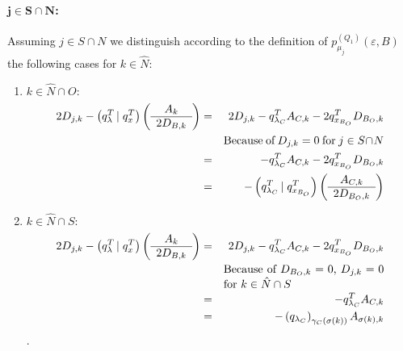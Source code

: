 \documentclass[a4paper]{article}
\newcommand{\pmu}[2]{\ensuremath{p_{\mu_{j}}^{(#1)}(\varepsilon, #2)}}
\begin{document}
\paragraph{$\mathbf{j \in S \cap N}$:}
Assuming $j \in S \cap N$ we distinguish according to the definition of
\pmu{Q_{1}}{B} the following cases for $k \in \hat{N}$:
\begin{enumerate}
\item $k \in \hat{N} \cap O:$
\begin{eqnarray}
\label{eq:r1_j_S_N_k_N_O}
    2D_{j,k}
    -\left(q_{\lambda}^{T} \left| \right. q_{x}^{T} \right)
    \left(\begin{array}{c}
            A_{k} \\
	    \hline
	    2D_{B, k}
	  \end{array}
    \right)
&=&
2D_{j,k} - q_{\lambda_{C}}^{T}A_{C, k} - 2q_{x_{B_{O}}}^{T}D_{B_{O},k}
\nonumber \\
&&\begin{minipage}{5cm}
Because of $D_{j,k}=0$ for $j \in S \cap N$
\end{minipage}
\nonumber \\
&=&
- q_{\lambda_{C}}^{T}A_{C, k} - 2q_{x_{B_{O}}}^{T}D_{B_{O},k}
\nonumber \\
&=&
-\left(q_{\lambda_{C}}^{T}\left|\right. q_{x_{B_{O}}}^{T}\right)
\left(\begin{array}{c}
        A_{C,k} \\
	\hline
	2D_{B_{O},k}
      \end{array}
\right)
\end{eqnarray}

\item $k \in \hat{N} \cap S:$
\begin{eqnarray}
\label{eq:r1_j_S_N_k_N_S}
    2D_{j,k}
    -\left(q_{\lambda}^{T} \left| \right. q_{x}^{T} \right)
    \left(\begin{array}{c}
            A_{k} \\
	    \hline
	    2D_{B, k}
	  \end{array}
    \right)
&=&
2D_{j,k} - q_{\lambda_{C}}^{T}A_{C, k} - 2q_{x_{B_{O}}}^{T}D_{B_{O},k}
\nonumber \\
&&\begin{minipage}{5cm}
Because of $D_{B_{O},k}=0$, $D_{j,k}=0$ for $k \in \hat{N} \cap S$
\end{minipage}
\nonumber \\
&=&
-q_{\lambda_{C}}^{T}A_{C,k}
\nonumber \\
&=&
-\left(q_{\lambda_{C}}\right)_{\gamma_{C}(\sigma(k))}A_{\sigma(k),k}
\end{eqnarray}.
\end{enumerate}
\end{document}

